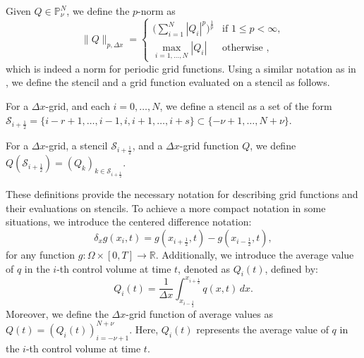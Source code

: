 Given $Q \in \mathbb{P}^{N}_{\nu}$, we define the $p$-norm as
\begin{equation}
	\label{chp-adv1d-sec-not1}
	\|Q\|_{p,\Delta x}=
	\begin{cases}
		\bigg( \sum_{i=1}^{N} |Q_i|^p \bigg)^{\frac{1}{p}} & \text{if } 1\leq p < \infty,\\
		\max_{i=1, \ldots, N}{|Q_i|} & \text{otherwise },
	\end{cases}
\end{equation}
which is indeed a norm for periodic grid functions.
Using a similar notation as in \citet{engwirda:2016}, we define the stencil and a grid function evaluated on a stencil as follows.
\begin{definition}[Stencil]
	For a $\Delta x$-grid, and each $i = 0, \ldots, N$, we define a stencil as a set of the form
	$\mathcal{S}_{i+\frac{1}{2}} = \{i-r+1, \ldots, i-1, i, i+1, \ldots, i+s\} \subset\{-\nu+1, \ldots, N+\nu\}$.
\end{definition}
\begin{definition}
	For a $\Delta x$-grid, a stencil $\mathcal{S}_{i+\frac{1}{2}}$,
	 and a $\Delta x$-grid function $Q$, we define $Q(\mathcal{S}_{i+\frac{1}{2}}) = (Q_k)_{k \in \mathcal{S}_{i+\frac{1}{2}}}$.
\end{definition}
These definitions provide the necessary notation for describing grid functions and their evaluations on stencils.
To achieve a more compact notation in some situations, we introduce the centered difference notation:
\begin{equation}
    \label{chp-adv1d-sec-adv-eq5}
	\delta_x {g}(x_i,t) = 
	{g}(x_{i+\frac{1}{2}},t) - 
	{g}(x_{i-\frac{1}{2}},t),
\end{equation}
for any function $g: \Omega \times [0,T] \to \mathbb{R}$.
Additionally, we introduce the average value of $q$ in the $i$-th control volume at time $t$, denoted as ${Q}_i(t)$, defined by:
\begin{equation}
	\label{chp-adv1d-sec1-not2}
	{Q}_i(t) = \frac{1}{\Delta x} \int_{x_{i-\frac{1}{2}}}^{x_{i+\frac{1}{2}}} {q}(x,t) \,dx.
\end{equation}
Moreover, we define the $\Delta x$-grid function of average values as $Q(t) = (Q_i(t))_{i=-\nu+1}^{N+\nu}$.
Here, $Q_i(t)$ represents the average value of $q$ in the $i$-th control volume at time $t$.

